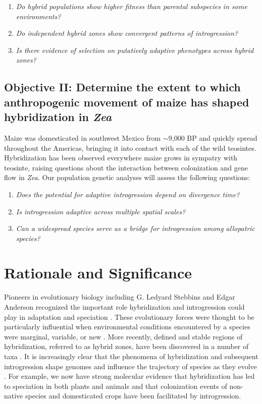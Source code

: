 \begin{enumerate}
\item \emph{Do hybrid populations show higher fitness than parental subspecies in some environments?}
\item \emph{Do independent hybrid zones show convergent patterns of introgression?}
\item \emph{Is there evidence of selection on putatively adaptive phenotypes across hybrid zones?}
\end{enumerate}

\subsection*{Objective II: Determine the extent to which anthropogenic movement of maize has shaped hybridization in \emph{Zea}}
Maize was domesticated in southwest Mexico from \zp{} $\sim$9,000 BP \citep{Matsuoka2002} and quickly spread throughout the Americas, bringing it into contact with each of the wild teosintes.
Hybridization has been observed everywhere maize grows in sympatry with teosinte, raising questions about the interaction between colonization and gene flow in \emph{Zea}.
Our population genetic analyses will assess the following questions:
\begin{enumerate}
\item \emph{Does the potential for adaptive introgression depend on divergence time?}
\item \emph{Is introgression adaptive across multiple spatial scales?}
\item \emph{Can a widespread species serve as a bridge for introgression among allopatric species?} 
\end{enumerate}

\section*{Rationale and Significance} 
Pioneers in evolutionary biology including G. Ledyard Stebbins and Edgar Anderson recognized the important role hybridization and introgression could play in adaptation and speciation \citep{Anderson1948, Anderson1954}.
These evolutionary forces were thought to be particularly influential when environmental conditions encountered by a species were marginal, variable, or new \citep{Stebbins1959}.
More recently, defined and stable regions of hybridization, referred to as hybrid zones, have been discovered in a number of taxa \citep[reviewed in ][]{HarrisonHybridZone, shurtliff2013, abbott2014}. 
It is increasingly clear that the phenomena of hybridization and subsequent introgression shape genomes and influence the trajectory of species as they evolve \citep{Ellstrand2014}.
For example, we now have strong molecular evidence that hybridization has led to speciation in both plants and animals \citep[reviewed in][]{mallet2007} and that colonization events of non-native species \citep{lucek2010} and domesticated crops \citep{he2011, Hufford2013} have been facilitated by introgression. 

